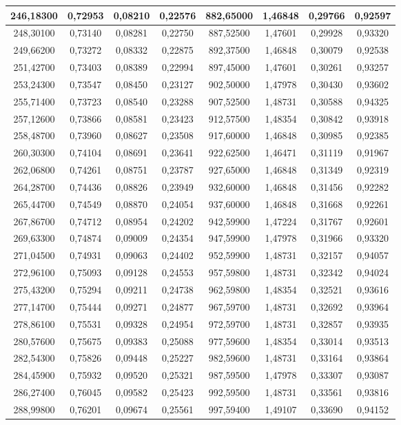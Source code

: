 \documentclass[a4paper,12pt]{article}
\numberwithin{equation}{section}
\begin{document}
\begin{appendices}
\begin{longtable}[c]{|c|c|c|c|c|c|c|c|}
246,18300	&	0,72953	&	0,08210	&	0,22576	&	882,65000	&	1,46848	&	0,29766	&	0,92597	\\\hline
248,30100	&	0,73140	&	0,08281	&	0,22750	&	887,52500	&	1,47601	&	0,29928	&	0,93320	\\\hline
249,66200	&	0,73272	&	0,08332	&	0,22875	&	892,37500	&	1,46848	&	0,30079	&	0,92538	\\\hline
251,42700	&	0,73403	&	0,08389	&	0,22994	&	897,45000	&	1,47601	&	0,30261	&	0,93257	\\\hline
253,24300	&	0,73547	&	0,08450	&	0,23127	&	902,50000	&	1,47978	&	0,30430	&	0,93602	\\\hline
255,71400	&	0,73723	&	0,08540	&	0,23288	&	907,52500	&	1,48731	&	0,30588	&	0,94325	\\\hline
257,12600	&	0,73866	&	0,08581	&	0,23423	&	912,57500	&	1,48354	&	0,30842	&	0,93918	\\\hline
258,48700	&	0,73960	&	0,08627	&	0,23508	&	917,60000	&	1,46848	&	0,30985	&	0,92385	\\\hline
260,30300	&	0,74104	&	0,08691	&	0,23641	&	922,62500	&	1,46471	&	0,31119	&	0,91967	\\\hline
262,06800	&	0,74261	&	0,08751	&	0,23787	&	927,65000	&	1,46848	&	0,31349	&	0,92319	\\\hline
264,28700	&	0,74436	&	0,08826	&	0,23949	&	932,60000	&	1,46848	&	0,31456	&	0,92282	\\\hline
265,44700	&	0,74549	&	0,08870	&	0,24054	&	937,60000	&	1,46848	&	0,31668	&	0,92261	\\\hline
267,86700	&	0,74712	&	0,08954	&	0,24202	&	942,59900	&	1,47224	&	0,31767	&	0,92601	\\\hline
269,63300	&	0,74874	&	0,09009	&	0,24354	&	947,59900	&	1,47978	&	0,31966	&	0,93320	\\\hline
271,04500	&	0,74931	&	0,09063	&	0,24402	&	952,59900	&	1,48731	&	0,32157	&	0,94057	\\\hline
272,96100	&	0,75093	&	0,09128	&	0,24553	&	957,59800	&	1,48731	&	0,32342	&	0,94024	\\\hline
275,43200	&	0,75294	&	0,09211	&	0,24738	&	962,59800	&	1,48354	&	0,32521	&	0,93616	\\\hline
277,14700	&	0,75444	&	0,09271	&	0,24877	&	967,59700	&	1,48731	&	0,32692	&	0,93964	\\\hline
278,86100	&	0,75531	&	0,09328	&	0,24954	&	972,59700	&	1,48731	&	0,32857	&	0,93935	\\\hline
280,57600	&	0,75675	&	0,09383	&	0,25088	&	977,59600	&	1,48354	&	0,33014	&	0,93513	\\\hline
282,54300	&	0,75826	&	0,09448	&	0,25227	&	982,59600	&	1,48731	&	0,33164	&	0,93864	\\\hline
284,45900	&	0,75932	&	0,09520	&	0,25321	&	987,59500	&	1,47978	&	0,33307	&	0,93087	\\\hline
286,27400	&	0,76045	&	0,09582	&	0,25423	&	992,59500	&	1,48731	&	0,33561	&	0,93816	\\\hline
288,99800	&	0,76201	&	0,09674	&	0,25561	&	997,59400	&	1,49107	&	0,33690	&	0,94152	\\\hline


\end{longtable}
\end{appendices}
\end{document}
